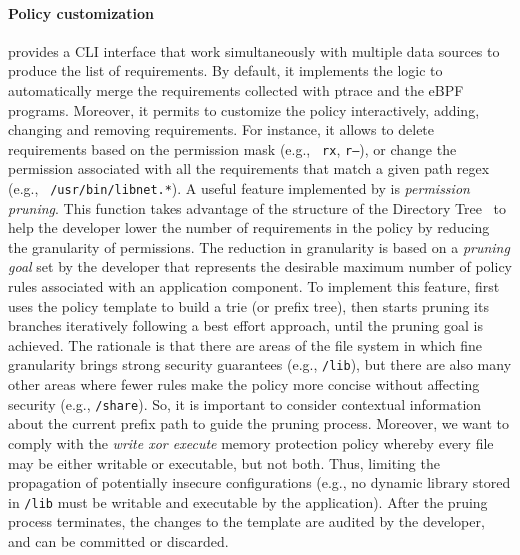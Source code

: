 \paragraph*{Policy customization} \dmng provides a CLI interface that
work simultaneously with multiple data sources to produce the list of
requirements. By default, it implements the logic to automatically
merge the requirements collected with ptrace and the eBPF
programs. Moreover, it permits to customize the policy interactively,
adding, changing and removing requirements. For instance, it allows to
delete requirements based on the permission mask (e.g., {\tt
  r\textunderscore x}, {\tt r--}), or change the permission associated
with all the requirements that match a given path regex (e.g., {\tt
  /usr/bin/libnet.*}).  \newline A useful feature implemented by \dmng
is {\em permission pruning}. This function takes advantage of the
structure of the Directory Tree~\cite{hier} to help the developer
lower the number of requirements in the policy by reducing the
granularity of permissions. The reduction in granularity is based on a
{\em pruning goal} set by the developer that represents the desirable
maximum number of policy rules associated with an application
component. To implement this feature, \dmng first uses the policy
template to build a trie (or prefix tree), then starts pruning its
branches iteratively following a best effort approach, until the
pruning goal is achieved.  The rationale is that there are areas of
the file system in which fine granularity brings strong security
guarantees (e.g., {\tt /lib}), but there are also many other areas
where fewer rules make the policy more concise without affecting
security (e.g., {\tt /share}). So, it is important to consider
contextual information about the current prefix path to guide the
pruning process.  Moreover, we want to comply with the {\em write xor
  execute} memory protection policy whereby every file may be either
writable or executable, but not both. Thus, limiting the propagation
of potentially insecure configurations (e.g., no dynamic library
stored in {\tt /lib} must be writable and executable by the
application).  After the pruing process terminates, the changes to the
template are audited by the developer, and can be committed or
discarded.


